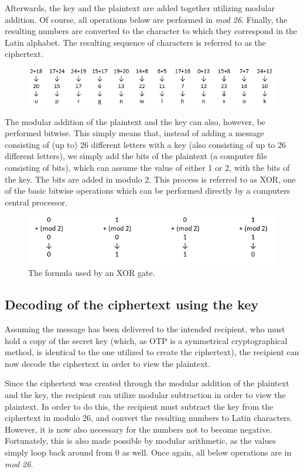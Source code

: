 \documentclass[12pt]{report}
\theoremstyle{definition}
\theoremstyle{remark}
\begin{document}
Afterwards, the key and the plaintext are added together utilizing modular addition. Of course, all operations below are performed in \textit{mod 26}. Finally, the resulting numbers are converted to the character to which they correspond in the Latin alphabet. The resulting sequence of characters is referred to as the ciphertext.

\begin{figure}[H]
\centering
\includegraphics[scale=1]{Table3.PNG}
\end{figure}

The modular addition of the plaintext and the key can also, however, be performed bitwise. This simply means that, instead of adding a message consisting of (up to) 26 different letters with a key (also consisting of up to 26 different letters), we simply add the bits of the plaintext (a computer file consisting of bits), which can assume the value of either 1 or 2, with the bits of the key. The bits are added in modulo 2. This process is referred to as XOR, one of the basic bitwise operations which can be performed directly by a computers central processor.

\begin{figure}[H]
\centering
\includegraphics[scale=1]{XORgate.PNG}
\caption{The formula used by an XOR gate.}
\end{figure}

\subsection{Decoding of the ciphertext using the key}
Assuming the message has been delivered to the intended recipient, who must hold a copy of the secret key (which, as OTP is a symmetrical cryptographical method, is identical to the one utilized to create the ciphertext), the recipient can now decode the ciphertext in order to view the plaintext.

Since the ciphertext was created through the modular addition of the plaintext and the key, the recipient can utilize modular subtraction in order to view the plaintext. In order to do this, the recipient must subtract the key from the ciphertext in modulo 26, and convert the resulting numbers to Latin characters.  However, it is now also necessary for the numbers not to become negative. Fortunately, this is also made possible by modular arithmetic, as the values simply loop back around from 0 as well. Once again, all below operations are in \textit{mod 26}.
\end{document}
